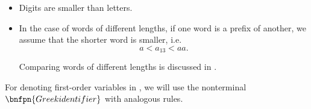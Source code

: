\begin{remark}
\begin{itemize}
    \item Digits are smaller than letters.

    \item In the case of words of different lengths, if one word is a prefix of another, we assume that the shorter word is smaller, i.e.
    \begin{equation*}
      a < a_{13} < aa.
    \end{equation*}

    Comparing words of different lengths is discussed in .
  \end{itemize}

   For denoting first-order variables in , we will use the nonterminal \( \bnfpn{Greek identifier} \) with analogous rules.
\end{remark}

